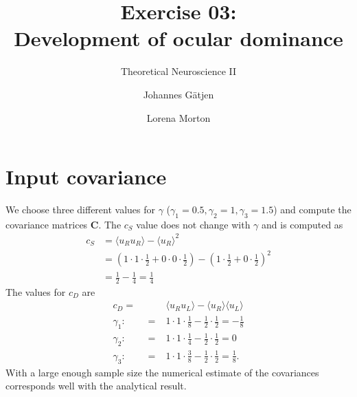 \documentclass{scrartcl}
\title{Exercise 03:\\Development of ocular dominance}
\subtitle{Theoretical Neuroscience II}
\author{Johannes G\"atjen \and Lorena Morton}
\begin{document}
\maketitle

\section{Input covariance}

We choose three different values for $\gamma$ ($\gamma_1=0.5, \gamma_2=1, \gamma_3=1.5$) and compute the covariance matrices $\mathbf{C}$. The $c_S$ value does not change with $\gamma$ and is computed as 
\begin{align*}
c_S &= \langle u_Ru_R \rangle - \langle u_R \rangle^2 \\
&= \left(1 \cdot 1 \cdot \frac{1}{2} + 0 \cdot 0 \cdot \frac{1}{2}\right) - \left(1 \cdot \frac{1}{2} + 0 \cdot \frac{1}{2}\right)^2 \\
&= \frac{1}{2} - \frac{1}{4} = \frac{1}{4}
\end{align*}
The values for $c_D$ are
\begin{align*}
c_D =& \langle u_Ru_L \rangle - \langle u_R \rangle \langle u_L \rangle \\
\gamma_1: \qquad =& 1 \cdot 1 \cdot \frac{1}{8} - \frac{1}{2} \cdot \frac{1}{2} = - \frac{1}{8} \\
\gamma_2:\qquad =& 1 \cdot 1 \cdot \frac{1}{4} - \frac{1}{2} \cdot \frac{1}{2} = 0 \\
\gamma_3:\qquad =& 1 \cdot 1 \cdot \frac{3}{8} - \frac{1}{2} \cdot \frac{1}{2} = \frac{1}{8}.
\end{align*}
With a large enough sample size the numerical estimate of the covariances corresponds well with the analytical result.
\end{document}
